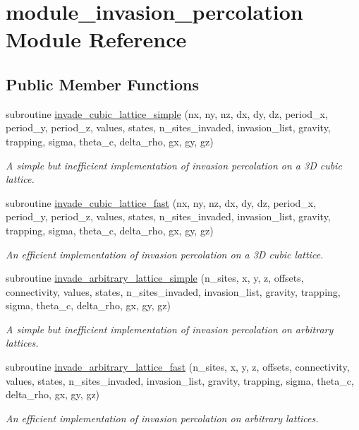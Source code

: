 \hypertarget{classmodule__invasion__percolation}{
\section{module\-\_\-invasion\-\_\-percolation \-Module \-Reference}
\label{classmodule__invasion__percolation}
}
\subsection*{\-Public \-Member \-Functions}
\begin{DoxyCompactItemize}
\item 
subroutine \hyperlink{classmodule__invasion__percolation_a9249417bedcee0cd28dc65eba16868bd}{invade\-\_\-cubic\-\_\-lattice\-\_\-simple} (nx, ny, nz, dx, dy, dz, period\-\_\-x, period\-\_\-y, period\-\_\-z, values, states, n\-\_\-sites\-\_\-invaded, invasion\-\_\-list, gravity, trapping, sigma, theta\-\_\-c, delta\-\_\-rho, gx, gy, gz)
\begin{DoxyCompactList}\small\item\em \-A simple but inefficient implementation of invasion percolation on a 3\-D cubic lattice. \end{DoxyCompactList}\item 
subroutine \hyperlink{classmodule__invasion__percolation_a9e829564e60b49318517ba5e944da4d8}{invade\-\_\-cubic\-\_\-lattice\-\_\-fast} (nx, ny, nz, dx, dy, dz, period\-\_\-x, period\-\_\-y, period\-\_\-z, values, states, n\-\_\-sites\-\_\-invaded, invasion\-\_\-list, gravity, trapping, sigma, theta\-\_\-c, delta\-\_\-rho, gx, gy, gz)
\begin{DoxyCompactList}\small\item\em \-An efficient implementation of invasion percolation on a 3\-D cubic lattice. \end{DoxyCompactList}\item 
subroutine \hyperlink{classmodule__invasion__percolation_a0da324ef25bd77f5a4d986a19d401902}{invade\-\_\-arbitrary\-\_\-lattice\-\_\-simple} (n\-\_\-sites, x, y, z, offsets, connectivity, values, states, n\-\_\-sites\-\_\-invaded, invasion\-\_\-list, gravity, trapping, sigma, theta\-\_\-c, delta\-\_\-rho, gx, gy, gz)
\begin{DoxyCompactList}\small\item\em \-A simple but inefficient implementation of invasion percolation on arbitrary lattices. \end{DoxyCompactList}\item 
subroutine \hyperlink{classmodule__invasion__percolation_a227847a38bc7518fdce187bbad590de0}{invade\-\_\-arbitrary\-\_\-lattice\-\_\-fast} (n\-\_\-sites, x, y, z, offsets, connectivity, values, states, n\-\_\-sites\-\_\-invaded, invasion\-\_\-list, gravity, trapping, sigma, theta\-\_\-c, delta\-\_\-rho, gx, gy, gz)
\begin{DoxyCompactList}\small\item\em \-An efficient implementation of invasion percolation on arbitrary lattices. \end{DoxyCompactList}\end{DoxyCompactItemize}


